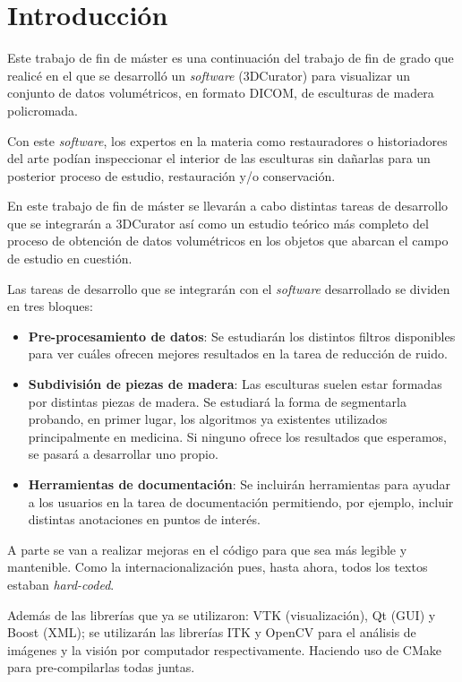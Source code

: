 \chapter{Introducción}

Este trabajo de fin de máster es una continuación del trabajo de fin de grado que realicé en el que se desarrolló un \textit{software} (3DCurator) para visualizar un conjunto de datos volumétricos, en formato DICOM, de esculturas de madera policromada.

Con este \textit{software}, los expertos en la materia como restauradores o historiadores del arte podían inspeccionar el interior de las esculturas sin dañarlas para un posterior proceso de estudio, restauración y/o conservación.

En este trabajo de fin de máster se llevarán a cabo distintas tareas de desarrollo que se integrarán a 3DCurator así como un estudio teórico más completo del proceso de obtención de datos volumétricos en los objetos que abarcan el campo de estudio en cuestión.

Las tareas de desarrollo que se integrarán con el \textit{software} desarrollado se dividen en tres bloques:

\begin{itemize}
	\item \textbf{Pre-procesamiento de datos}: Se estudiarán los distintos filtros disponibles para ver cuáles ofrecen mejores resultados en la tarea de reducción de ruido.
	\item \textbf{Subdivisión de piezas de madera}: Las esculturas suelen estar formadas por distintas piezas de madera. Se estudiará la forma de segmentarla probando, en primer lugar, los algoritmos ya existentes utilizados principalmente en medicina. Si ninguno ofrece los resultados que esperamos, se pasará a desarrollar uno propio.
	\item \textbf{Herramientas de documentación}: Se incluirán herramientas para ayudar a los usuarios en la tarea de documentación permitiendo, por ejemplo, incluir distintas anotaciones en puntos de interés.
\end{itemize}

A parte se van a realizar mejoras en el código para que sea más legible y mantenible. Como la internacionalización pues, hasta ahora, todos los textos estaban \textit{hard-coded}.

Además de las librerías que ya se utilizaron: VTK \cite{vtk} (visualización), Qt \cite{qt} (GUI) y Boost \cite{boost} (XML); se utilizarán las librerías ITK \cite{itk} y OpenCV \cite{opencv} para el análisis de imágenes y la visión por computador respectivamente. Haciendo uso de CMake \cite{cmake} para pre-compilarlas todas juntas.

